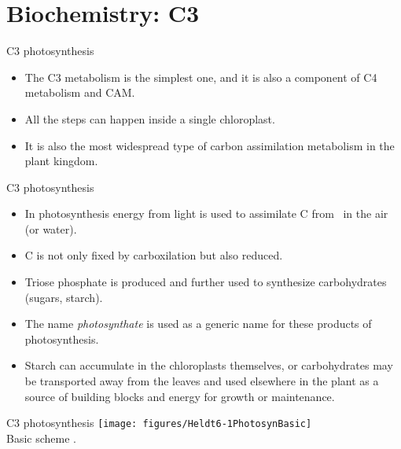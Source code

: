 \documentclass[10pt]{beamer}
\begin{document}
\section{Biochemistry: C3}

\begin{frame}{C3 photosynthesis}
    \begin{itemize}
        \item The C3 metabolism is the simplest one, and it is also a
        component of C4 metabolism and CAM.
        \item All the steps can happen inside a single chloroplast.
        \item It is also the most widespread type of carbon assimilation
        metabolism in the plant kingdom.
    \end{itemize}
\end{frame}

\begin{frame}{C3 photosynthesis}
    \begin{itemize}
        \item In photosynthesis energy from light is used to
        assimilate C from \COtwo\ in the air (or water).
        \item C is not only fixed by carboxilation but also reduced.
        \item Triose phosphate is produced and further used to
        synthesize carbohydrates (sugars, starch).
        \item The name \emph{photosynthate} is used as a generic
        name for these products of photosynthesis.
        \item Starch can accumulate in the chloroplasts themselves,
        or carbohydrates may be transported away from the leaves and
        used elsewhere in the plant as a source of building blocks
        and energy for growth or maintenance.
    \end{itemize}
\end{frame}

\begin{frame}{C3 photosynthesis}
    \centering
    \texttt{[image: figures/Heldt6-1PhotosynBasic]}\\
    {\small Basic scheme \autocite[from][]{Heldt1997}.}
\end{frame}
\end{document}
